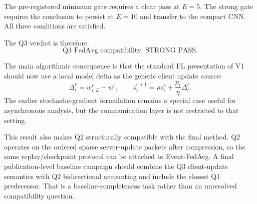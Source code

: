 The pre-registered minimum gate requires a clear pass at $E=5$. The strong gate requires the conclusion to persist at $E=10$ and transfer to the compact CNN. All three conditions are satisfied.

The Q3 verdict is therefore
\begin{equation}
\boxed{\text{Q3 FedAvg compatibility: STRONG PASS}.}
\end{equation}

The main algorithmic consequence is that the standard FL presentation of V1 should now use a local model delta as the generic client update source:
\begin{equation}
\boxed{
\Delta_i^r=w_{i,E}^r-w^r,
\qquad
z_i^{r+1}=\rho z_i^r+\frac{p_i}{\eta}\Delta_i^r.
}
\end{equation}
The earlier stochastic-gradient formulation remains a special case useful for asynchronous analysis, but the communication layer is not restricted to that setting.

This result also makes Q2 structurally compatible with the final method. Q2 operates on the ordered sparse server-update packets after compression, so the same replay/checkpoint protocol can be attached to Event-FedAvg. A final publication-level baseline campaign should combine the Q3 client-update semantics with Q2 bidirectional accounting and include the closest Q1 predecessor. That is a baseline-completeness task rather than an unresolved compatibility question.
